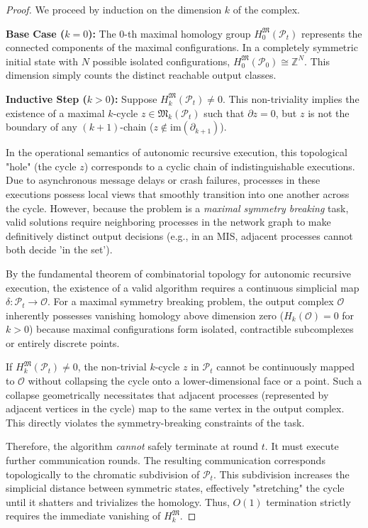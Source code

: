 \begin{proof}
We proceed by induction on the dimension $k$ of the complex. 

\textbf{Base Case ($k=0$):} The $0$-th maximal homology group $H_0^{\mathfrak{M}}(\mathcal{P}_t)$ represents the connected components of the maximal configurations. In a completely symmetric initial state with $N$ possible isolated configurations, $H_0^{\mathfrak{M}}(\mathcal{P}_0) \cong \mathbb{Z}^N$. This dimension simply counts the distinct reachable output classes.

\textbf{Inductive Step ($k > 0$):} Suppose $H_k^{\mathfrak{M}}(\mathcal{P}_t) \neq 0$. This non-triviality implies the existence of a maximal $k$-cycle $z \in \mathfrak{M}_k(\mathcal{P}_t)$ such that $\partial z = 0$, but $z$ is not the boundary of any $(k+1)$-chain ($z \notin \text{im}(\partial_{k+1})$). 

In the operational semantics of autonomic recursive execution, this topological "hole" (the cycle $z$) corresponds to a cyclic chain of indistinguishable executions. Due to asynchronous message delays or crash failures, processes in these executions possess local views that smoothly transition into one another across the cycle. However, because the problem is a \textit{maximal symmetry breaking} task, valid solutions require neighboring processes in the network graph to make definitively distinct output decisions (e.g., in an MIS, adjacent processes cannot both decide 'in the set'). 

By the fundamental theorem of combinatorial topology for autonomic recursive execution, the existence of a valid algorithm requires a continuous simplicial map $\delta: \mathcal{P}_t \to \mathcal{O}$. For a maximal symmetry breaking problem, the output complex $\mathcal{O}$ inherently possesses vanishing homology above dimension zero ($H_k(\mathcal{O}) = 0$ for $k>0$) because maximal configurations form isolated, contractible subcomplexes or entirely discrete points.

If $H_k^{\mathfrak{M}}(\mathcal{P}_t) \neq 0$, the non-trivial $k$-cycle $z$ in $\mathcal{P}_t$ cannot be continuously mapped to $\mathcal{O}$ without collapsing the cycle onto a lower-dimensional face or a point. Such a collapse geometrically necessitates that adjacent processes (represented by adjacent vertices in the cycle) map to the same vertex in the output complex. This directly violates the symmetry-breaking constraints of the task.

Therefore, the algorithm \textit{cannot} safely terminate at round $t$. It must execute further communication rounds. The resulting communication corresponds topologically to the chromatic subdivision of $\mathcal{P}_t$. This subdivision increases the simplicial distance between symmetric states, effectively "stretching" the cycle until it shatters and trivializes the homology. Thus, $O(1)$ termination strictly requires the immediate vanishing of $H_k^{\mathfrak{M}}$.
\end{proof}

